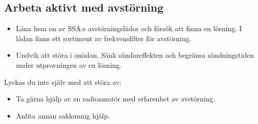 \subsection{Arbeta aktivt med avstörning}

\begin{itemize}
	\item Låna hem en av SSA:s avstörningslådor och försök att finna en lösning.
	I lådan finns ett sortiment av frekvensfilter för avstörning.
	\item Undvik att störa i onödan.
	Sänk sändareffekten och begränsa sändningstiden under utprovningen av en
	lösning.
\end{itemize}
Lyckas du inte själv med att störa av:
\begin{itemize}
	\item Ta gärna hjälp av en radioamatör med erfarenhet av avstörning.
	\item Anlita annan sakkunnig hjälp.
\end{itemize}
